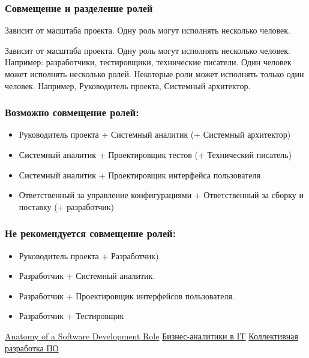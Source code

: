 \documentclass{../industrial-development}
\begin{document}
\begin{frame} \frametitle{Совмещение и разделение ролей}
Зависит от масштаба проекта. Одну роль могут исполнять несколько человек.
\end{frame}


Зависит от масштаба проекта. Одну роль могут исполнять несколько человек. Например: разработчики, тестировщики, технические писатели.
Один человек может исполнять несколько ролей. Некоторые роли может исполнять только один человек. Например, Руководитель проекта, Системный архитектор.

\begin{frame} \frametitle{Возможно совмещение ролей:}
\begin{itemize}
\item Руководитель проекта + Системный аналитик (+ Системный архитектор)
\item Системный аналитик + Проектировщик тестов (+ Технический писатель)
\item Системный аналитик + Проектировщик интерфейса пользователя
\item Ответственный за управление конфигурациями + Ответственный за сборку и поставку (+ разработчик)
\end{itemize}  
\end{frame}

\begin{frame} \frametitle{Не рекомендуется совмещение ролей:}
\begin{itemize}
\item Руководитель проекта + Разработчик)
\item Разработчик + Системный аналитик.
\item Разработчик + Проектировщик интерфейсов пользователя.
\item Разработчик + Тестировщик
\end{itemize}  
\end{frame}

\begin{thebibliography}{99}

 \href{https://www.developer.com/tools/article.php/3526491/}{Anatomy of a Software Development Role}
 \href{https://itkeys.org/business-analysts/}{Бизнес-аналитики в IT}
 \href{http://vit-prog.narod.ru/page/TRPP/section_3/subjec_3.2.htm}{Коллективная разработка ПО}
\end{thebibliography}
\end{document}
